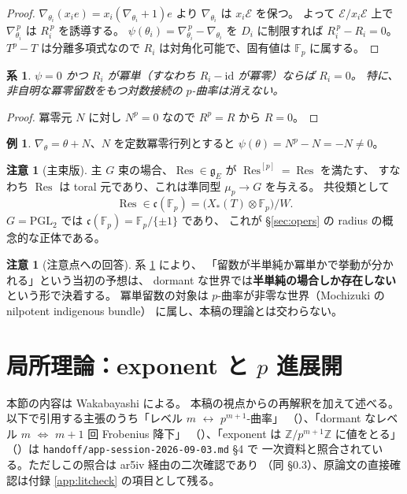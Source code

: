 \documentclass[a4paper,11pt]{ltjsarticle}
\theoremstyle{plain}
\newtheorem{corollary}[theorem]{系}
\theoremstyle{definition}
\newtheorem{example}[theorem]{例}
\newtheorem{remark}[theorem]{注意}
\newcommand{\bbZ}{\mathbb{Z}}
\newcommand{\bbF}{\mathbb{F}}
\newcommand{\cE}{\mathcal{E}}
\newcommand{\fg}{\mathfrak{g}}
\newcommand{\Res}{\operatorname{Res}}
\begin{document}
\begin{proof}
$\nabla_{\theta_i}(x_ie)=x_i(\nabla_{\theta_i}+1)e$ より
$\nabla_{\theta_i}$ は $x_i\cE$ を保つ。
よって $\cE/x_i\cE$ 上で $\nabla_{\theta_i}^{\,p}$ は $R_i^{\,p}$ を誘導する。
$\psi(\theta_i)=\nabla_{\theta_i}^{\,p}-\nabla_{\theta_i}$ を $D_i$ に制限すれば
$R_i^{\,p}-R_i=0$。
$T^p-T$ は分離多項式なので $R_i$ は対角化可能で、固有値は $\bbF_p$ に属する。
\end{proof}

\begin{corollary}\label{cor:nilpotent}
$\psi=0$ かつ $R_i$ が冪単（すなわち $R_i-\mathrm{id}$ が冪零）ならば $R_i=0$。
特に、非自明な冪零留数をもつ対数接続の $p$-曲率は消えない。
\end{corollary}

\begin{proof}
冪零元 $N$ に対し $N^p=0$ なので $R^p=R$ から $R=0$。
\end{proof}

\begin{example}
$\nabla_\theta=\theta+N$、$N$ を定数冪零行列とすると
$\psi(\theta)=N^p-N=-N\neq0$。
\end{example}

\begin{remark}[主束版]
主 $G$ 束の場合、$\Res\in\fg_{E}$ が $\Res^{[p]}=\Res$ を満たす、
すなわち $\Res$ は toral 元であり、これは準同型 $\mu_p\to G$ を与える。
共役類として
\[
  \Res\in\mathfrak{c}(\bbF_p)=\bigl(X_*(T)\otimes\bbF_p\bigr)/W .
\]
$G=\mathrm{PGL}_2$ では $\mathfrak{c}(\bbF_p)=\bbF_p/\{\pm1\}$ であり、
これが \S\ref{sec:opers} の radius の概念的な正体である。
\end{remark}

\begin{remark}[注意点への回答]
系 \ref{cor:nilpotent} により、
「留数が半単純か冪単かで挙動が分かれる」という当初の予想は、
dormant な世界では\textbf{半単純の場合しか存在しない}という形で決着する。
冪単留数の対象は $p$-曲率が非零な世界（Mochizuki の nilpotent indigenous bundle）
に属し、本稿の理論とは交わらない。
\end{remark}

\section{局所理論：exponent と $p$ 進展開}\label{sec:local}

本節の内容は Wakabayashi \cite[\S2--3]{Wak} による。
本稿の視点からの再解釈を加えて述べる。
以下で引用する主張のうち「レベル $m$ $\leftrightarrow$ $p^{m+1}$-曲率」
（\cite[Def.~2.1.3]{Wak}）、「dormant なレベル $m$ $\iff$ $m+1$ 回 Frobenius 降下」
（\cite[Cor.~2.1.6]{Wak}）、「exponent は $\bbZ/p^{m+1}\bbZ$ に値をとる」
（\cite[Def.~3.3.1]{Wak}）は \texttt{handoff/app-session-2026-09-03.md} \S4 で
一次資料と照合されている。ただしこの照合は ar5iv 経由の二次確認であり
（同 \S0.3）、原論文の直接確認は付録 \ref{app:litcheck} の項目として残る。
\end{document}
